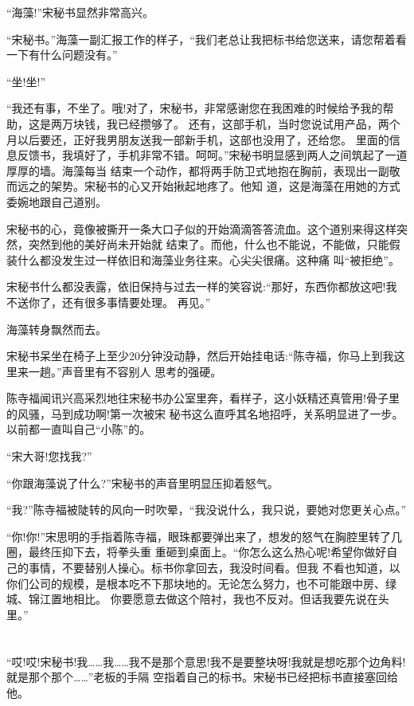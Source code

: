 \documentclass[11pt,a4paper,onecolumn]{article}
\begin{document}
``海藻!''宋秘书显然非常高兴。

``宋秘书。''海藻一副汇报工作的样子，``我们老总让我把标书给您送来，请您帮着看一下有什么问题没有。''

``坐!坐!''

``我还有事，不坐了。哦!对了，宋秘书，非常感谢您在我困难的时候给予我的帮助，这是两万块钱，我已经攒够了。
还有，这部手机，当时您说试用产品，两个月以后要还，正好我男朋友送我一部新手机，这部也没用了，还给您。
里面的信息反馈书，我填好了，手机非常不错。呵呵。''宋秘书明显感到两人之间筑起了一道厚厚的墙。海藻每当
结束一个动作，都将两手防卫式地抱在胸前，表现出一副敬而远之的架势。宋秘书的心又开始揪起地疼了。他知
道，这是海藻在用她的方式委婉地跟自己道别。

宋秘书的心，竟像被撕开一条大口子似的开始滴滴答答流血。这个道别来得这样突然，突然到他的美好尚未开始就
结束了。而他，什么也不能说，不能做，只能假装什么都没发生过一样依旧和海藻业务往来。心尖尖很痛。这种痛
叫``被拒绝''。

宋秘书什么都没表露，依旧保持与过去一样的笑容说:``那好，东西你都放这吧!我不送你了，还有很多事情要处理。
再见。''

海藻转身飘然而去。

宋秘书呆坐在椅子上至少20分钟没动静，然后开始挂电话:``陈寺福，你马上到我这里来一趟。''声音里有不容别人
思考的强硬。

陈寺福闻讯兴高采烈地往宋秘书办公室里奔，看样子，这小妖精还真管用!骨子里的风骚，马到成功啊!第一次被宋
秘书这么直呼其名地招呼，关系明显进了一步。以前都一直叫自己``小陈''的。

``宋大哥!您找我?''

``你跟海藻说了什么?''宋秘书的声音里明显压抑着怒气。

``我?''陈寺福被陡转的风向一时吹晕，``我没说什么，我只说，要她对您更关心点。''

``你!你!''宋思明的手指着陈寺福，眼珠都要弹出来了，想发的怒气在胸腔里转了几圈，最终压抑下去，将拳头重
重砸到桌面上。``你怎么这么热心呢!希望你做好自己的事情，不要替别人操心。标书你拿回去，我没时间看。但我
不看也知道，以你们公司的规模，是根本吃不下那块地的。无论怎么努力，也不可能跟中房、绿城、锦江置地相比。
你要愿意去做这个陪衬，我也不反对。但话我要先说在头里。''

\section[\thesection]{}

``哎!哎!宋秘书!我……我……我不是那个意思!我不是要整块呀!我就是想吃那个边角料!就是那个那个……''老板的手隔
空指着自己的标书。宋秘书已经把标书直接塞回给他。
\end{document}
